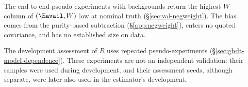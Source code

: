 The end-to-end pseudo-experiments with backgrounds return the highest-$W$ column of $(\Eavail,W)$ low at nominal truth (\S\ref{sec:val-negweight}). The bias comes from the purity-based subtraction (\S\ref{app:negweight}), enters no quoted covariance, and has no established size on data.

The development assessment of $R$ uses repeated pseudo-experiments (\S\ref{sec:gbdt-model-dependence}). These experiments are not an independent validation: their samples were used during development, and their assessment seeds, although separate, were later also used in the estimator's development.


